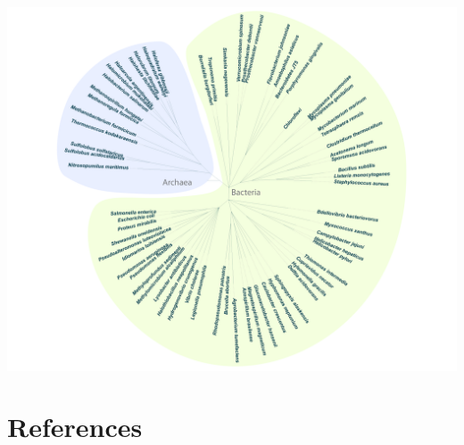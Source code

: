 \documentclass[]{tufte-book}
\begin{document}
\includegraphics[width=23.06in]{img/Tree}

\hypertarget{references}{%
\chapter{References}\label{references}}


\end{document}
